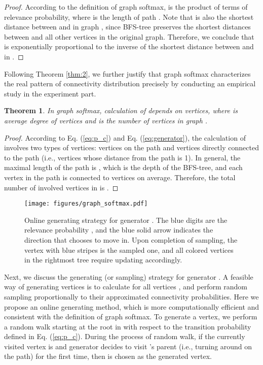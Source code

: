 \documentclass[letterpaper]{article}
\newtheorem{theorem}{Theorem}
\begin{document}
		\begin{proof}
			According to the definition of graph softmax,  is the product of  terms of relevance probability, where  is the length of path .
			Note that  is also the shortest distance between  and  in graph , since BFS-tree  preserves the shortest distances between  and all other vertices in the original graph.
			Therefore, we conclude that  is exponentially proportional to the inverse of the shortest distance between  and  in .
		\end{proof}
		Following Theorem \ref{thm:2}, we further justify that graph softmax characterizes the real pattern of connectivity distribution precisely by conducting an empirical study in the experiment part.
		
		\begin{theorem}
			In graph softmax, calculation of  depends on  vertices, where  is average degree of vertices and  is the number of vertices in graph .
		\end{theorem}
		
		\begin{proof}
			According to Eq. (\ref{eq:p_c}) and Eq. (\ref{eq:generator}), the calculation of  involves two types of vertices: vertices on the path  and vertices directly connected to the path (i.e., vertices whose distance from the path is 1).
			In general, the maximal length of the path is , which is the depth of the BFS-tree, and each vertex in the path is connected to  vertices on average.
			Therefore, the total number of involved vertices in  is .
		\end{proof}
		
		\begin{figure*}
			\centering
			\texttt{[image: figures/graph\_softmax.pdf]}
			\caption{Online generating strategy for generator . The blue digits are the relevance probability , and the blue solid arrow indicates the direction that  chooses to move in. Upon completion of sampling, the vertex with blue stripes is the sampled one, and all colored vertices in the rightmost tree require updating accordingly.}
			\label{fig:graph_softmax}
		\end{figure*}
		
		Next, we discuss the generating (or sampling) strategy for generator .
		A feasible way of generating vertices is to calculate  for all vertices , and perform random sampling proportionally to their approximated connectivity probabilities.
		Here we propose an online generating method, which is more computationally efficient and consistent with the definition of graph softmax.
		To generate a vertex, we perform a random walk starting at the root  in  with respect to the transition probability defined in Eq. (\ref{eq:p_c}).
		During the process of random walk, if the currently visited vertex is  and generator  decides to visit 's parent (i.e., turning around on the path) for the first time, then  is chosen as the generated vertex.
		
\end{document}
